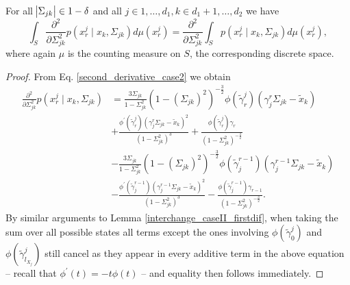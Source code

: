 \begin{corollary}
    For all $\abs{\Sigma_{jk}} \in 1-\delta$ and all $j \in 1, \dots, d_1, k\in d_1 +1, \dots, d_2$ we have
    \begin{equation*}
        \int_S \frac{\partial^2 }{\partial \Sigma_{jk}^2} p(x^j_{r} \mid x_{k}, \Sigma_{jk}) d\mu(x_r^j)= \frac{\partial^2}{\partial \Sigma_{jk}^2} \int_S p(x^j_{r} \mid x_{k}, \Sigma_{jk}) d\mu(x_r^j),
    \end{equation*}
    where again $\mu$ is the counting measure on $S$, the corresponding discrete space.
    
    \begin{proof}
        From Eq. \eqref{second_derivative_case2} we obtain 
        \begin{equation*}
            \begin{split}
                \frac{\partial^2 }{\partial \Sigma_{jk}^2} p(x^j_{r} \mid x_{k}, \Sigma_{jk}) 
                &= \frac{3\Sigma_{jk}}{1-\Sigma_{jk}^2} (1-(\Sigma_{jk})^2)^{-\frac{3}{2}} \phi({\tilde{\gamma}}^j_{r})({\gamma}_j^r\Sigma_{jk} - {\tilde{x}}_{k}) \\
                &+\frac{\phi^\prime({\tilde{\gamma}}^j_{r})({\gamma}_j^r\Sigma_{jk} - {\tilde{x}}_{k})^2}{(1-\Sigma_{jk}^2)^3} + \frac{\phi({\tilde{\gamma}}^j_{r}){\gamma}_{r}}{(1-\Sigma_{jk}^2)^{-\frac{3}{2}}} \\
                &- \frac{3\Sigma_{jk}}{1-\Sigma_{jk}^2} (1-(\Sigma_{jk})^2)^{-\frac{3}{2}} \phi({\tilde{\gamma}}_j^{r-1})({\gamma}_j^{r-1}\Sigma_{jk} - {\tilde{x}}_{k}) \\
                &- \frac{\phi^\prime({\tilde{\gamma}}_j^{r-1})({\gamma}_j^{r-1}\Sigma_{jk} - {\tilde{x}}_{k})^2}{(1-\Sigma_{jk}^2)^3} - \frac{\phi({\tilde{\gamma}}_j^{r-1}){\gamma}_{r-1}}{(1-\Sigma_{jk}^2)^{-\frac{3}{2}}}.
            \end{split}
        \end{equation*}
        By similar arguments to Lemma \ref{interchange_caseII_firstdif}, when taking the sum over all possible states all terms except the ones involving $\phi({\tilde{\gamma}}^j_{0})$ and $\phi({\tilde{\gamma}}^j_{l_{X_j}})$ still cancel as they appear in every additive term in the above equation -- recall that $\phi^\prime(t) = -t\phi(t)$ -- and equality then follows immediately. 
    \end{proof}
\end{corollary}    




